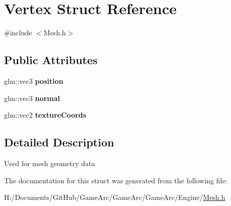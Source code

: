 \hypertarget{struct_vertex}{\section{Vertex Struct Reference}
\label{struct_vertex}
}


{\ttfamily \#include $<$Mesh.\+h$>$}

\subsection*{Public Attributes}
\begin{DoxyCompactItemize}
\item 
\hypertarget{struct_vertex_a030819fdc241743bbd3e180a6b132ed3}{glm\+::vec3 {\bfseries position}}\label{struct_vertex_a030819fdc241743bbd3e180a6b132ed3}

\item 
\hypertarget{struct_vertex_a3aa35fe84025ecf1acccb5f65f5577fd}{glm\+::vec3 {\bfseries normal}}\label{struct_vertex_a3aa35fe84025ecf1acccb5f65f5577fd}

\item 
\hypertarget{struct_vertex_a03ba1fdd25400383cd40bd2153d08ef1}{glm\+::vec2 {\bfseries texture\+Coords}}\label{struct_vertex_a03ba1fdd25400383cd40bd2153d08ef1}

\end{DoxyCompactItemize}


\subsection{Detailed Description}
Used for mesh geometry data 

The documentation for this struct was generated from the following file\+:\begin{DoxyCompactItemize}
\item 
H\+:/\+Documents/\+Git\+Hub/\+Game\+Arc/\+Game\+Arc/\+Game\+Arc/\+Engine/\hyperlink{_mesh_8h}{Mesh.\+h}\end{DoxyCompactItemize}
